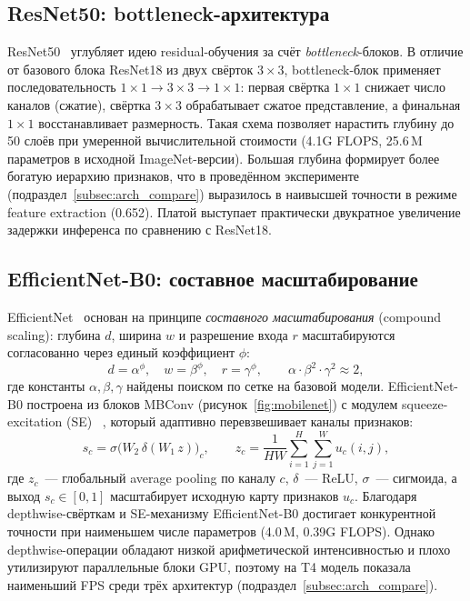 \documentclass[10pt,a4paper]{report}
\numberwithin{equation}{chapter}
\numberwithin{figure}{chapter}
\numberwithin{table}{chapter}
\begin{document}
\subsection{ResNet50: bottleneck-архитектура}

ResNet50~\cite{he2016resnet} углубляет идею residual-обучения
за счёт \emph{bottleneck}-блоков. В отличие от базового блока ResNet18
из двух свёрток $3\times3$, bottleneck-блок применяет последовательность
$1\times1 \rightarrow 3\times3 \rightarrow 1\times1$: первая свёртка
$1\times1$ снижает число каналов (сжатие), свёртка $3\times3$ обрабатывает
сжатое представление, а финальная $1\times1$ восстанавливает размерность.
Такая схема позволяет нарастить глубину до 50 слоёв при умеренной
вычислительной стоимости (4.1G FLOPS, 25.6\,M параметров в исходной
ImageNet-версии). Большая глубина формирует более богатую иерархию
признаков, что в проведённом эксперименте
(подраздел~\ref{subsec:arch_compare}) выразилось в наивысшей точности
в режиме feature extraction (0.652). Платой выступает практически
двукратное увеличение задержки инференса по сравнению с ResNet18.

\subsection{EfficientNet-B0: составное масштабирование}

EfficientNet~\cite{tan2019efficientnet} основан на принципе
\emph{составного масштабирования} (compound scaling): глубина $d$,
ширина $w$ и разрешение входа $r$ масштабируются согласованно через
единый коэффициент $\phi$:
\begin{equation}
  d = \alpha^{\phi}, \quad w = \beta^{\phi}, \quad r = \gamma^{\phi},
  \qquad \alpha \cdot \beta^{2} \cdot \gamma^{2} \approx 2,
  \label{eq:compound_scaling}
\end{equation}
где константы $\alpha, \beta, \gamma$ найдены поиском по сетке на
базовой модели. EfficientNet-B0 построена из блоков MBConv
(рисунок~\ref{fig:mobilenet}) с модулем squeeze-excitation (SE)~%
\cite{hu2018senet}, который адаптивно перевзвешивает каналы признаков:
\begin{equation}
  s_c = \sigma\!\bigl(W_2\,\delta(W_1\, z)\bigr)_c,\qquad
  z_c = \frac{1}{HW}\sum_{i=1}^{H}\sum_{j=1}^{W} u_c(i,j),
  \label{eq:se_block}
\end{equation}
где $z_c$~--- глобальный average pooling по каналу $c$, $\delta$~--- ReLU,
$\sigma$~--- сигмоида, а выход $s_c \in [0,1]$ масштабирует исходную
карту признаков $u_c$. Благодаря depthwise-свёрткам и SE-механизму
EfficientNet-B0 достигает конкурентной точности при наименьшем числе
параметров (4.0\,M, 0.39G FLOPS). Однако depthwise-операции обладают
низкой арифметической интенсивностью и плохо утилизируют параллельные
блоки GPU, поэтому на T4 модель показала наименьший FPS среди трёх
архитектур (подраздел~\ref{subsec:arch_compare}).
\end{document}
